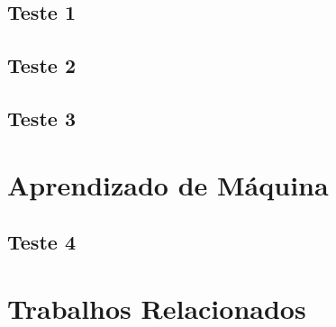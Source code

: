 \paragraph{}

\subsection{Teste 1}

\paragraph{}

\subsection{Teste 2}

\paragraph{}

\subsection{Teste 3}

\paragraph{}

\section{Aprendizado de Máquina}

\subsection{Teste 4}

\paragraph{}


\section{Trabalhos Relacionados}